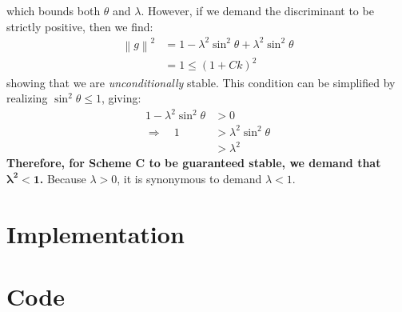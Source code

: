 \documentclass{hw_report}
\begin{document}
    which bounds both $\theta$ and $\lambda$.
    However, if we demand the discriminant to be strictly positive, then we find:
    \begin{equation*}
        \begin{split}
            \left\| g \right\|^2 &= 1 - \lambda^2 \sin^2 \theta +\lambda^2 \sin^2 \theta\\
            &= 1 \leq \left( 1+Ck \right)^2
        \end{split}
    \end{equation*}
    showing that we are \textit{unconditionally} stable.
    This condition can be simplified by realizing $\sin^2\theta \leq 1$, giving:
    \begin{equation*}
        \begin{split}
            1-\lambda^2\sin^2 \theta &>0\\
            \Rightarrow \quad  1&>\lambda^2 \sin^2 \theta \\
            &> \lambda ^2
        \end{split}
    \end{equation*}
    \textbf{Therefore, for Scheme C to be guaranteed stable, we demand that $\boldsymbol{{\lambda}^2<1}$.}
    Because $\lambda > 0$, it is synonymous to demand $\lambda <1$.


    \section{Implementation}
    

    
    
    \appendix
    \section{Code}
    \inputminted{python}{578_HW1.py}
\end{document}
